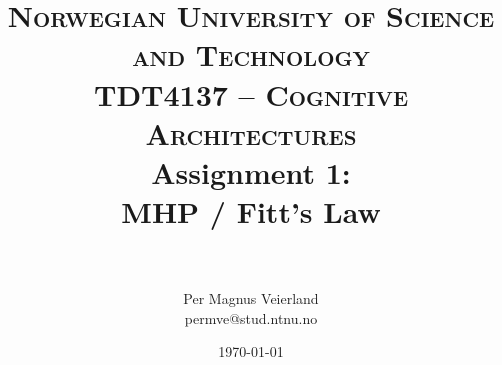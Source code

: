 

\title{	
\normalfont \normalsize 
\textsc{Norwegian University of Science and Technology\\TDT4137 -- Cognitive Architectures}
\horrule{0.5pt} \\[0.4cm]
\huge Assignment 1:\\ MHP / Fitt's Law\\
\horrule{2pt} \\[0.5cm]
}

\author{Per Magnus Veierland\\permve@stud.ntnu.no}

\date{\normalsize\today}




\maketitle

